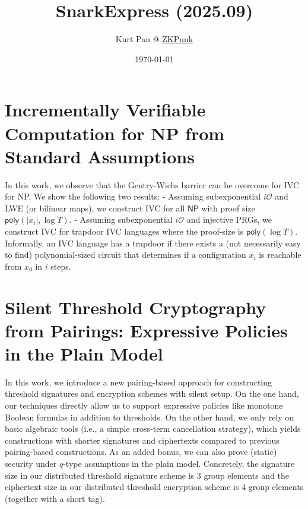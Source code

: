 \documentclass[11pt]{article}
\theoremstyle{definition}
\theoremstyle{remark}
\theoremstyle{plain}
\begin{document}
\title{SnarkExpress (2025.09)}
\author{Kurt Pan @ \href{https://zkpunk.pro}{ZKPunk}}
\date{\today}
\maketitle
\tableofcontents

\section{\cite{cryptoeprint:2025/1546} Incrementally Verifiable Computation for NP from Standard Assumptions}
In this work, we observe that the Gentry-Wichs barrier can be overcome for IVC for NP. We show the following two results: - Assuming subexponential $i\mathcal{O}$ and LWE (or bilinear maps), we construct IVC for all $\mathsf{NP}$ with proof size $\mathsf{poly}(|x_i|,\log T)$. - Assuming subexponential $i\mathcal{O}$ and injective PRGs, we construct IVC for trapdoor IVC languages where the proof-size is $\mathsf{poly}(\log T)$. Informally, an IVC language has a trapdoor if there exists a (not necessarily easy to find) polynomial-sized circuit that determines if a configuration $x_i$ is reachable from $x_0$ in $i$ steps.

\section{\cite{cryptoeprint:2025/1547} Silent Threshold Cryptography from Pairings: Expressive Policies in the Plain Model}
 In this work, we introduce a new pairing-based approach for constructing threshold signatures and encryption schemes with silent setup. On the one hand, our techniques directly allow us to support expressive policies like monotone Boolean formulas in addition to thresholds. On the other hand, we only rely on basic algebraic tools (i.e., a simple cross-term cancellation strategy), which yields constructions with shorter signatures and ciphertexts compared to previous pairing-based constructions. As an added bonus, we can also prove (static) security under $q$-type assumptions in the plain model. Concretely, the signature size in our distributed threshold signature scheme is 3 group elements and the ciphertext size in our distributed threshold encryption scheme is 4 group elements (together with a short tag).
\end{document}

